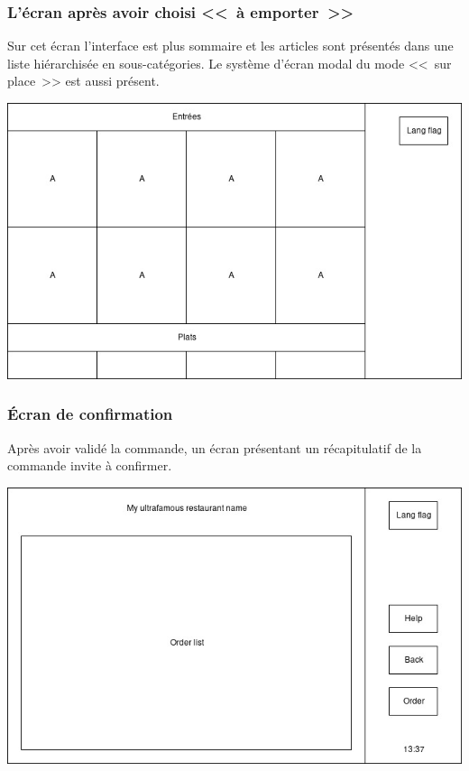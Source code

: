 \documentclass[a4paper,12pt]{article}
\begin{document}
\subsubsection{L'écran après avoir choisi <<~à emporter~>>}

Sur cet écran l'interface est plus sommaire et les articles sont présentés dans une liste hiérarchisée en
sous-catégories. Le système d'écran modal du mode <<~sur place~>> est aussi présent.

\begin{center}
	\includegraphics[width=\textwidth]{takeaway_screen.jpg}
\end{center}

\subsubsection{Écran de confirmation}
Après avoir validé la commande, un écran présentant un récapitulatif de la commande invite à confirmer.

\begin{center}
	\includegraphics[width=\textwidth]{confirmation_screen.jpg}
\end{center}
\end{document}
